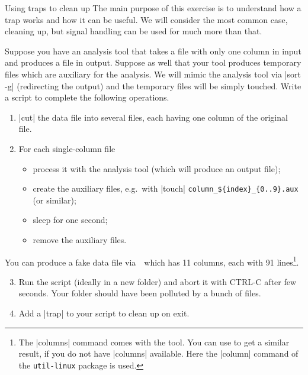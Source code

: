
\begin{exercise}[Inspirational]{Using traps to clean up}
    The main purpose of this exercise is to understand how a trap works and how it can be useful.
    We will consider the most common case, cleaning up, but signal handling can be used for much more than that.

    Suppose you have an analysis tool that takes a file with only one column in input and produces a file in output.
    Suppose as well that your tool produces temporary files which are auxiliary for the analysis.
    We will mimic the analysis tool via \bash|sort -g| (redirecting the output) and the temporary files will be simply touched.
    Write a script to complete the following operations.
    \begin{enumerate}
        \item \bash|cut| the data file into several files, each having one column of the original file.
        \item For each single-column file
              \begin{itemize}
                  \item process it with the analysis tool (which will produce an output file);
                  \item create the auxiliary files, e.g.\ with \bash|touch| \texttt{column\_\$\{index\}\_\{0..9\}.aux} (or similar);
                  \item sleep for one second;
                  \item remove the auxiliary files.
              \end{itemize}
    \end{enumerate}
    You can produce a fake data file via \,\, which has 11 columns, each with 91 lines\footnote{The \bash|columns| command comes with the  tool. You can use  to get a similar result, if you do not have \bash|columns| available. Here the \bash|column| command of the \texttt{util-linux} package is used.}.
    \begin{enumerate}
        \setcounter{enumi}{2}
        \item Run the script (ideally in a new folder) and abort it with CTRL-C after few seconds.
              Your folder should have been polluted by a bunch of files.
        \item Add a \bash|trap| to your script to clean up on exit.
    \end{enumerate}
    \vspace{3mm}
\end{exercise}